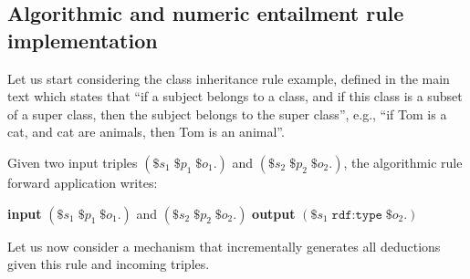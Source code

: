 \subsection{Algorithmic and numeric entailment rule implementation} \label{RDFS-entailment-rules-1}

Let us start considering the class inheritance rule example, defined in the main text which states that ``if a subject belongs to a class, and if this class is a subset of a super class, then the subject belongs to the super class'', e.g., ``if Tom is a cat, and cat are animals, then Tom is an animal''. 

Given two input triples $(\$s_1 \; \$p_1 \; \$o_1 .)$ and $(\$s_2 \; \$p_2 \; \$o_2 .)$, the algorithmic rule forward application writes:
\begin{algorithmic}
\State \textbf{input} $(\$s_1 \; \$p_1 \; \$o_1 .)$ and $(\$s_2 \; \$p_2 \; \$o_2 .)$
    \State \textbf{output} $(\$s_1 \; \texttt{rdf:type} \; \$o_2 .)$
\EndIf
\end{algorithmic}

Let us now consider a mechanism that incrementally generates all deductions given this rule and incoming triples.

